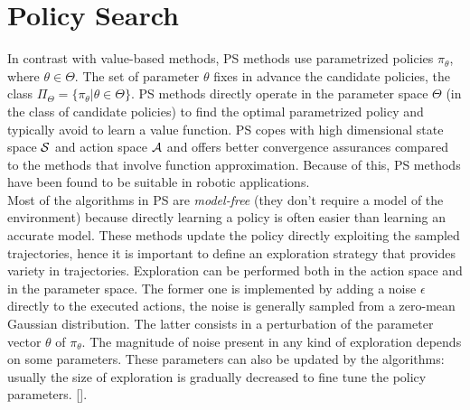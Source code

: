 \section{Policy Search}\label{sec:ps}
In contrast with value-based methods, \acf{PS} methods use parametrized policies $\pi_{\theta}$, where $\theta \in \Theta$. The set of parameter $\theta$ fixes in advance the candidate policies, \ie the class $\Pi_{\Theta} = \{ \pi_{\theta} | \theta \in \Theta \}$. \ac{PS} methods directly operate in the parameter space $\Theta$ (\ie in the class of candidate policies) to find the optimal parametrized policy and typically avoid to learn a value function. \ac{PS} copes with high dimensional state space $\mathcal{S}$ and action space $\mathcal{A}$ and offers better convergence assurances compared to the methods that involve function approximation. Because of this, \ac{PS} methods have been found to be suitable in robotic applications.\\
\newline
Most of the algorithms in \ac{PS} are \emph{model-free} (\ie they don't require a model of the environment) because directly learning a policy is often easier than learning an accurate model. These methods update the policy directly exploiting the sampled trajectories, hence it is important to define an exploration strategy that provides variety in trajectories. Exploration can be performed both in the action space and in the parameter space. The former one is implemented by adding a noise $\epsilon$ directly to the executed actions, the noise is generally sampled from a zero-mean Gaussian distribution. The latter consists in a perturbation of the parameter vector $\theta$ of $\pi_{\theta}$. The magnitude of noise present in any kind of exploration depends on some parameters. These parameters can also be updated by the algorithms: usually the size of exploration is gradually decreased to fine tune the policy parameters. [\citet{deisenroth2013Survey}].

